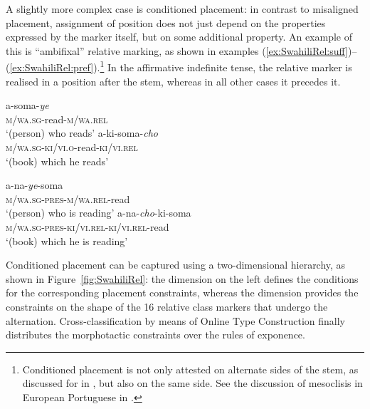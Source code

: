 \documentclass[output=paper
 	        ,biblatex
                ,babelshorthands
                ,newtxmath
                ,draftmode
                ,colorlinks, citecolor=brown
]{langscibook}
\begin{document}
\begin{exe}
\begin{xlist}
\begin{exe}
\begin{xlist}
A slightly more complex case is conditioned placement: in contrast to
misaligned placement, assignment of position does not just depend on
the properties expressed by the marker itself, but on some additional
property. An example of this is  ``ambifixal'' relative
marking, as shown in examples
(\ref{ex:SwahiliRel:suff})--(\ref{ex:SwahiliRel:pref}).\footnote{Conditioned
  placement is not only attested on alternate sides of the stem, as
  discussed for  in \citet{Stump93}, but also on the same
  side. See the discussion of mesoclisis in European Portuguese in
  \citet{Crysmann:Bonami:2016}.} In the affirmative indefinite tense,
the relative marker is realised in a position after the stem, whereas
in all other cases it precedes it. 

\begin{exe}
  \ex\label{ex:SwahiliRel:suff}
  \begin{xlist}
    \ex\gll  a-soma-\textit{ye}\\
    \textsc{m/wa.sg}-read\textsc{-m/wa.rel}\\
    \glt ‘(person) who reads’
    \ex\gll a-ki-soma-\textit{cho}\\
    \textsc{m/wa.sg}-\textsc{ki/vi.o}-read-\textsc{ki/vi.rel}\\
    \glt ‘(book) which he reads’
  \end{xlist}
  \ex\label{ex:SwahiliRel:pref}
  \begin{xlist}
    \ex\gll  a-na-\textit{ye}-soma\\
    \textsc{m/wa.sg-pres-m/wa.rel}-read\\
    \glt ‘(person) who is reading’
    \ex\gll a-na-\textit{cho}-ki-soma\\
    \textsc{m/wa.sg-pres-ki/vi.rel-ki/vi.rel}-read\\
    \glt ‘(book) which he is reading’
  \end{xlist}
\end{exe}

Conditioned placement can be captured using a two-dimensional
hierarchy, as shown in Figure~\ref{fig:SwahiliRel}: the
 dimension on the left defines the conditions for
the corresponding placement constraints, whereas the 
dimension provides the constraints on the shape of the 16 relative
class markers that undergo the alternation.  Cross-classification by
means of Online Type Construction finally distributes the morphotactic
constraints over the rules of exponence.
  


\end{xlist}
\end{exe}
\end{xlist}
\end{exe}
\end{document}
